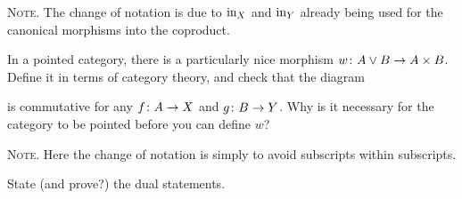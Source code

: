 {\scshape Note}. The change of notation is due to $\mathrm{in}_X$ and $\mathrm{in}_Y$ already being used for the canonical morphisms into the coproduct.
\item In a pointed category, there is a particularly nice morphism $w\colon A\lor B\to A\times B$. Define it in terms of category theory, and check that the diagram
\bse
{}
\ese
is commutative for any $f\colon A\to X$ and $g\colon B\to Y$. Why is it necessary for the category to be pointed before you can define $w$?

{\scshape Note}. Here the change of notation is simply to avoid subscripts within subscripts.
\item State (and prove?) the dual statements.
\een
\ep

